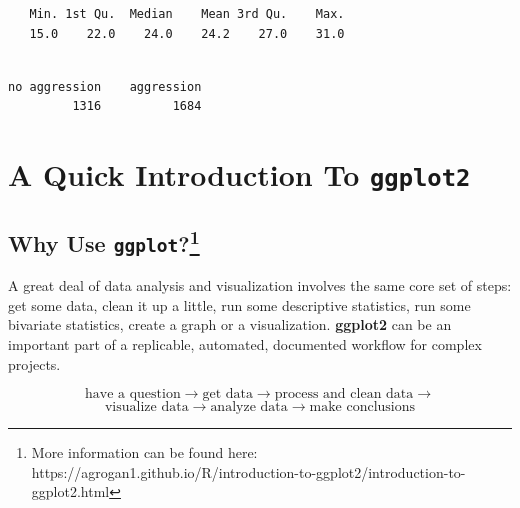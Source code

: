 \documentclass[
  letterpaper,
  DIV=11,
  numbers=noendperiod]{scrreprt}
\newenvironment{Shaded}{\begin{snugshade}}{\end{snugshade}}
\newcommand{\FunctionTok}[1]{\textcolor[rgb]{0.28,0.35,0.67}{#1}}
\newcommand{\NormalTok}[1]{\textcolor[rgb]{0.00,0.23,0.31}{#1}}
\newcommand{\SpecialCharTok}[1]{\textcolor[rgb]{0.37,0.37,0.37}{#1}}
\begin{document}
\begin{Shaded}
\end{Shaded}

\begin{verbatim}
   Min. 1st Qu.  Median    Mean 3rd Qu.    Max. 
   15.0    22.0    24.0    24.2    27.0    31.0 
\end{verbatim}

\begin{Shaded}
\end{Shaded}

\begin{verbatim}

no aggression    aggression 
         1316          1684 
\end{verbatim}


\hypertarget{a-quick-introduction-to-ggplot2}{%
\chapter{\texorpdfstring{A Quick Introduction To
\texttt{ggplot2}}{A Quick Introduction To ggplot2}}\label{a-quick-introduction-to-ggplot2}}

\hypertarget{why-use-ggplotmoreinformation}{%
\section[Why Use \texttt{ggplot}?]{\texorpdfstring{Why Use
\texttt{ggplot}?\footnote{More information can be found here:
  https://agrogan1.github.io/R/introduction-to-ggplot2/introduction-to-ggplot2.html}}{Why Use ggplot?}}\label{why-use-ggplotmoreinformation}}

A great deal of data analysis and visualization involves the same core
set of steps: get some data, clean it up a little, run some descriptive
statistics, run some bivariate statistics, create a graph or a
visualization. \textbf{ggplot2} can be an important part of a
replicable, automated, documented workflow for complex projects.

\[\text{have a question} \rightarrow \text{get data} \rightarrow \text{process and clean data} \rightarrow\]
\[\text{visualize data} \rightarrow \text{analyze data} \rightarrow \text{make conclusions}\]
\end{document}
